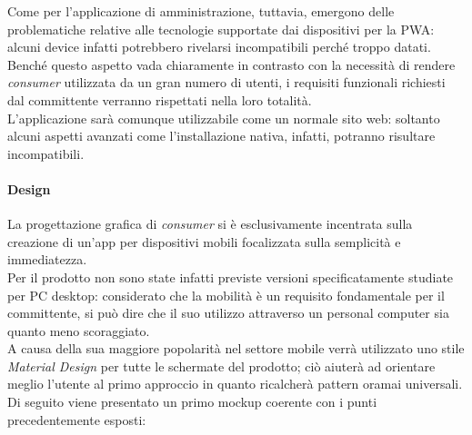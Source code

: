 \documentclass[12pt]{article}
\begin{document}
Come per l'applicazione di amministrazione, tuttavia, emergono delle problematiche relative alle tecnologie supportate dai dispositivi per la PWA: alcuni device infatti potrebbero rivelarsi incompatibili perché troppo datati.\\
Benché questo aspetto vada chiaramente in contrasto con la necessità di rendere \textit{consumer} utilizzata da un gran numero di utenti, i requisiti funzionali richiesti dal committente verranno rispettati nella loro totalità.\\
L'applicazione sarà comunque utilizzabile come un normale sito web: soltanto alcuni aspetti avanzati come l'installazione nativa, infatti, potranno risultare incompatibili.\newpage
\paragraph{Design}
La progettazione grafica di \textit{consumer} si è esclusivamente incentrata sulla creazione di un'app per dispositivi mobili focalizzata sulla semplicità e immediatezza.\\
Per il prodotto non sono state infatti previste versioni specificatamente studiate per PC desktop: considerato che la mobilità è un requisito fondamentale per il committente, si può dire che il suo utilizzo attraverso un personal computer sia quanto meno scoraggiato.\\
A causa della sua maggiore popolarità nel settore mobile verrà utilizzato uno stile \textit{Material Design} per tutte le schermate del prodotto; ciò aiuterà ad orientare meglio l'utente al primo approccio in quanto ricalcherà pattern oramai universali.
Di seguito viene presentato un primo mockup coerente con i punti precedentemente esposti:
\end{document}
